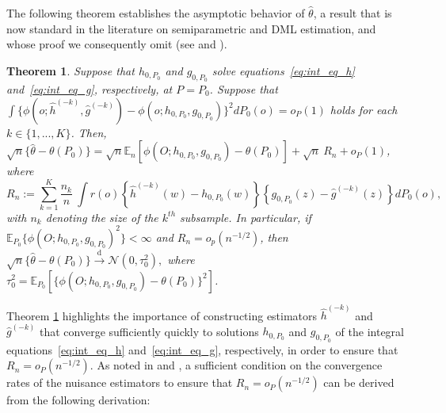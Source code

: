 \documentclass[twoside,11pt]{article}
\newtheorem{theorem}{Theorem}
\newcommand{\E}{\mathbb{E}}
\newcommand{\mc}{\mathcal}
\begin{document}
The following theorem establishes the asymptotic behavior of $\hat\theta$, a result that is now standard in the literature on semiparametric and DML estimation, and whose proof we consequently omit (see \cite{robins2008higher, chernozhukov2018double, chernozhukov2023simple} and \cite{kennedy2024semiparametric}). 

\begin{theorem}
   Suppose that $h_{0,P_0}$ and $g_{0,P_0}$ solve equations~\eqref{eq:int_eq_h} and~\eqref{eq:int_eq_g}, respectively, at $P=P_0$. Suppose that $\int\{\phi(o;\hat {h}^{(-k)},\hat{g}^{(-k)}) - \phi(o; h_{0,P_0},g_{0,P_0})\}^2 dP_0(o) = o_P(1)$ holds for each $k \in \{1,...,K\}$. Then, $\sqrt{n}\{ \hat\theta-\theta(P_0)\} =\sqrt{n}\mathbb{E}_{n}%
\left[ \phi (O;h_{0,P_0},g_{0,P_0})-\theta(P_0)
\right] +\sqrt{n}\:R_{n}+o_{P}(1)$, where
    \[
      R_n:=\sum_{k=1}^K\frac{n_k}{n} \:\int r(o) \left\{\hat h^{(-k)}(w)-h_{0,P_0}(w)\right\}\left\{g_{0,P_0}(z)-\hat g^{(-k)}(z)\right\}dP_0(o),
    \]
with $n_k$ denoting the size of the $k^{th}$ subsample. In particular, if $\E_{P_0}\{\phi(O;h_{0,P_0},g_{0,P_0})^2\}<\infty$ and $R_n=o_p(n^{-1/2})$, then $ 
    \sqrt{n}\{ \hat\theta-\theta(P_0)\}\stackrel{\text{d}}{\longrightarrow}\mc{N}(0,\tau_0^2),
    $
where $\tau_0 ^{2}=\E_{P_0}[ \{ \phi (O;h_{0,P_0},g_{0,P_0})-\theta(P_0)\}
^{2}] $.
\label{theo:asymp_distr}
\end{theorem}

Theorem \ref{theo:asymp_distr} highlights the importance of constructing estimators $\hat h^{(-k)}$ and $\hat g^{(-k)}$ that converge sufficiently quickly to solutions $h_{0,P_0}$ and $g_{0,P_0}$ of the integral equations~\eqref{eq:int_eq_h} and~\eqref{eq:int_eq_g}, respectively, in order to ensure that $R_n=o_P(n^{-1/2})$. As noted in \cite{bennett2022inference} and \cite{chernozhukov2023simple}, a sufficient condition on the convergence rates of the nuisance estimators to ensure that $R_n=o_P(n^{-1/2})$ can be derived from the following derivation: 
    
\end{document}
